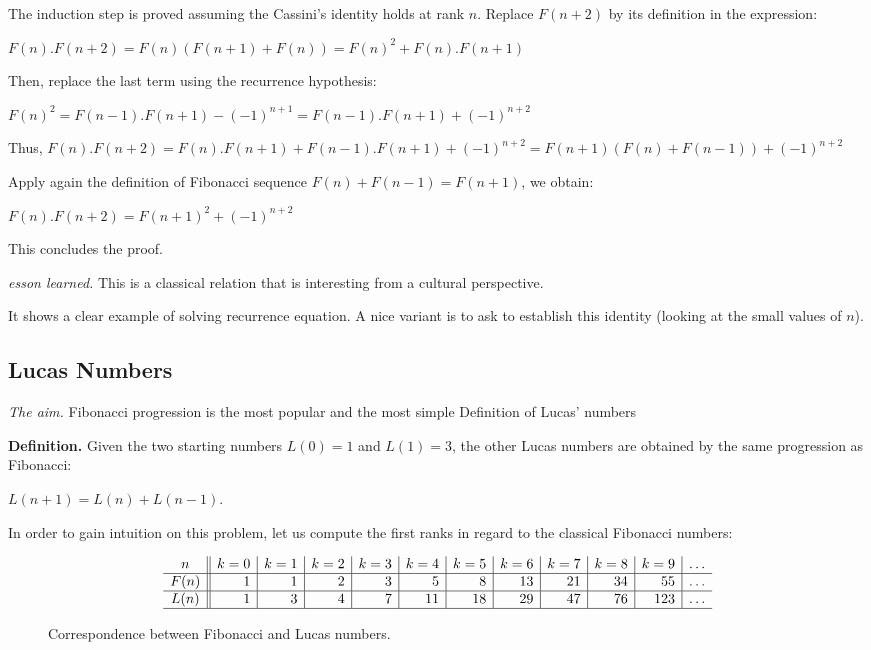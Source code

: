 The induction step is proved assuming the Cassini's identity holds at rank $n$.
Replace $F(n+2)$ by its definition in the expression:
 
$F(n).F(n+2) = F(n) (F(n+1)+F(n)) = F(n)^2 + F(n).F(n+1)$

Then, replace the last term using the recurrence hypothesis:

$F(n)^2 = F(n-1).F(n+1) - (-1)^{n+1} =F(n-1).F(n+1) + (-1)^{n+2} $

Thus,
$F(n).F(n+2) = F(n).F(n+1) + F(n-1).F(n+1) + (-1)^{n+2} = F(n+1) (F(n) + F(n-1)) + (-1)^{n+2}$ 

Apply again the definition of Fibonacci sequence $F(n) + F(n-1) = F(n+1)$, we obtain:

$F(n).F(n+2) = F(n+1)^2 + (-1)^{n+2}$

This concludes the proof. 
\medskip

\noindent \textit{esson learned.}
This is a classical relation that is interesting from a cultural perspective.

It shows a clear example of solving recurrence equation. 
A nice variant is to ask to establish this identity (looking at the small values of $n$).


\subsection{Lucas Numbers} 

\noindent \textit{The aim.}
Fibonacci progression is the most popular and the most simple Definition of Lucas' numbers

\textbf{Definition.}
Given the two starting numbers $L(0) = 1$ and $L(1) = 3$, 
the other Lucas numbers are obtained by the same progression as Fibonacci: 

$L(n+1) = L(n)+L(n-1)$.
\medskip

In order to gain intuition on this problem, let us compute the first ranks in regard to the classical Fibonacci numbers:
\begin{figure}[htb]
\[
\begin{array}{c||r|r|r|r|r|r|r|r|r|r|r}
{\displaystyle n } & k=0 & k=1 & k=2 & k=3 & k=4 & k=5 &
k=6 & k=7 & k=8 & k=9 & \ldots \\
\hline
F(n) & 1 & 1 &  2  &  3  &   5  &   8  &  13  &  21  & 34  & 55  & \ldots \\
\hline
L(n) & 1 & 3 &  4 &  7  &  11  &  18  &  29 & 47  & 76  & 123 & \ldots \\
\hline
\end{array}
\] 
\caption{Correspondence between Fibonacci and Lucas numbers.}
\label{fig:fiboLucas}
\end{figure}
%
%
%
\medskip

